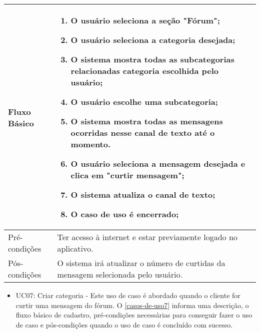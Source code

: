 \begin{apendicesenv}
\begin{longtable}{|p{3.3cm}|p{12.3cm}|}
		Fluxo Básico  & 
		\begin{enumerate}
			\item O usuário seleciona a seção "Fórum";
			\item O usuário seleciona a categoria desejada;
			\item O sistema mostra todas as subcategorias relacionadas categoria escolhida pelo usuário;
			\item O usuário escolhe uma subcategoria;
			\item O sistema mostra todas as mensagens ocorridas nesse canal de texto até o momento. 
			\item  O usuário seleciona a mensagem desejada e clica em "curtir mensagem";
			\item  O sistema atualiza o canal de texto;
			\item  O caso de uso é encerrado;
		\end{enumerate}\\
		\hline
		Pré-condições & Ter acesso à internet e estar previamente logado no aplicativo.\\
		\hline
		Pós-condições & O sistema irá atualizar o número de curtidas da mensagem selecionada pelo usuário.\\
		\hline
	
	\end{longtable}
	
	\pagebreak

	
	\begin{itemize}
		\item UC07: Criar categoria - Este uso de caso é abordado quando o cliente for curtir uma mensagem do fórum. O 	\autoref{casos-de-uso7}	informa uma descrição, o fluxo básico de cadastro, pré-condições necessárias para conseguir fazer o uso de caso e pós-condições quando o uso de caso é concluído com sucesso.\\
	\end{itemize}
	
	\begin{quadro}[htb]
		\centering
		\ABNTEXfontereduzida
		\caption[Caso de Uso Criar categoria]{Caso de Uso Criar categoria}
		\label{casos-de-uso7}
	\end{quadro}

	\begin{longtable}{|p{3.3cm}|p{12.3cm}|}
		\hline
		\thead{} & \thead{Ator} \\
		\hline
								

\end{longtable}
\end{apendicesenv}
